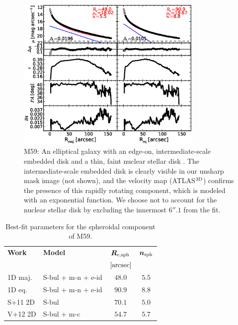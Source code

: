\documentclass[preprint2]{emulateapj}
\newcommand{\fitfigurewidth}{0.8\textwidth}
\begin{document}
  \begin{figure}[h]
  \begin{center}
  \includegraphics[width=\fitfigurewidth]{images/m59_1Dfit.eps}
  \caption{M59:
  An elliptical galaxy with an edge-on, intermediate-scale embedded disk \citep{scorzabender1995}
  and a thin, faint nuclear stellar disk \citep{ferrarese2006acsvcs,ledo2010}. 
  The intermediate-scale embedded disk is clearly visible in our unsharp mask image (not shown), and 
  the velocity map (ATLAS$^{\rm 3D}$) confirms the presence of this rapidly rotating component, which is modeled with an exponential function.
  We choose not to account for the nuclear stellar disk by excluding the innermost $6''.1$ from the fit.  
  }
  \end{center}
  \end{figure}

  \begin{table}[h]
  \small
  \caption{Best-fit parameters for the spheroidal component of M59.}
  \begin{center}
  \begin{tabular}{llcc}
  \hline
  {\bf Work} & {\bf Model}   & $\bm R_{\rm e,sph}$    & $\bm n_{\rm sph}$ \\
    &  &  $[\rm arcsec]$ & \\
  \hline
  1D maj. & S-bul + m-n + e-id & $48.0$  &  $5.5$ \\
  1D eq.  & S-bul + m-n + e-id & $90.9$  &  $8.8$ \\
  \hline 
  S+11 2D         & S-bul       & $70.1$  &  $5.0$ \\
  V+12 2D         & S-bul + m-c & $54.7$  &  $5.7$ \\
  \hline
  \end{tabular}
  \end{center}
  \label{tab:m59}
  \end{table}
\end{document}
